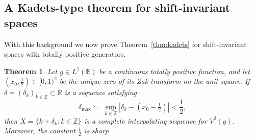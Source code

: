 \documentclass[reqno,a4paper,12pt]{amsart}
\numberwithin{equation}{section}
\newtheorem{theorem}[definition]{Theorem}
\def\Z{{\mathbb Z}}
\def\R{{\mathbb R}}
\newcommand\1{\mathds{1}}
\begin{document}
\subsection{A Kadets-type theorem for shift-invariant spaces}
With this background we now prove Theorem~\ref{thm:kadets} for shift-invariant
spaces with totally positive generators.


\begin{theorem}\label{thm:kadets-b}
Let $g\in L^1(\mathbb R)$ be a continuous totally positive function, and let $(x_0,\frac12)\in[0,1)^2$ be the unique zero of its Zak
transform on the unit square.
If
$\delta=(\delta_k)_{k\in\mathbb Z} \subset \R$ is a sequence satisfying
$$
\delta _{\max} :=    \sup _{k\in\Z } |\delta _k-(x_0-\tfrac{1}{2})|<\frac12, 
$$
then $X = \{ k+\delta_k : k \in \Z \}$ is a complete interpolating
sequence for $V^2(g)$.
Moreover, the constant $\frac12$ is sharp.  
\end{theorem}
\end{document}
